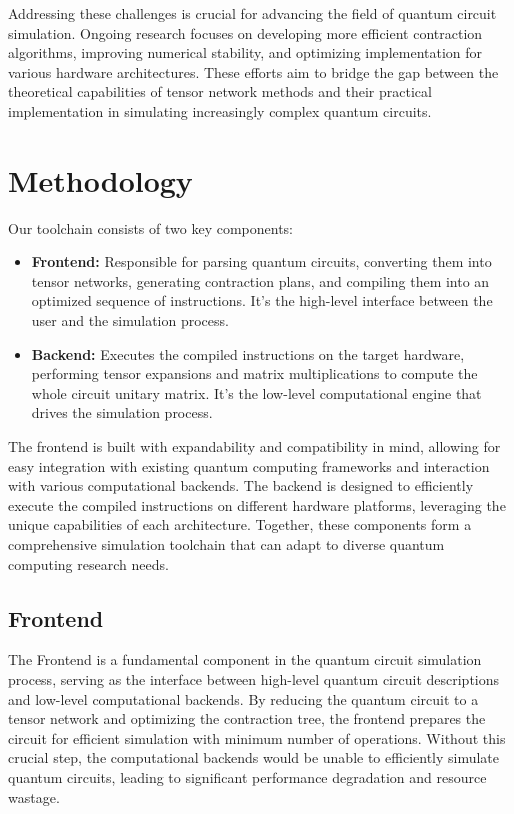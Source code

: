 \documentclass[12pt,oneside,a4paper]{article}
\begin{document}
Addressing these challenges is crucial for advancing the field of quantum circuit simulation. Ongoing research focuses on developing more efficient contraction algorithms, improving numerical stability, and optimizing implementation for various hardware architectures. These efforts aim to bridge the gap between the theoretical capabilities of tensor network methods and their practical implementation in simulating increasingly complex quantum circuits.



\section{Methodology}
\label{sec:methodology}

Our toolchain consists of two key components:

\begin{itemize}
    \item \textbf{Frontend:} Responsible for parsing quantum circuits, converting them into tensor networks, generating contraction plans, and compiling them into an optimized sequence of instructions. It's the high-level interface between the user and the simulation process.
    \item \textbf{Backend:} Executes the compiled instructions on the target hardware, performing tensor expansions and matrix multiplications to compute the whole circuit unitary matrix. It's the low-level computational engine that drives the simulation process.
\end{itemize}

The frontend is built with expandability and compatibility in mind, allowing for easy integration with existing quantum computing frameworks and interaction with various computational backends. The backend is designed to efficiently execute the compiled instructions on different hardware platforms, leveraging the unique capabilities of each architecture. Together, these components form a comprehensive simulation toolchain that can adapt to diverse quantum computing research needs.

\subsection{Frontend}

The Frontend is a fundamental component in the quantum circuit simulation process, serving as the interface between high-level quantum circuit descriptions and low-level computational backends. By reducing the quantum circuit to a tensor network and optimizing the contraction tree, the frontend prepares the circuit for efficient simulation with minimum number of operations. Without this crucial step, the computational backends would be unable to efficiently simulate quantum circuits, leading to significant performance degradation and resource wastage.
\end{document}

